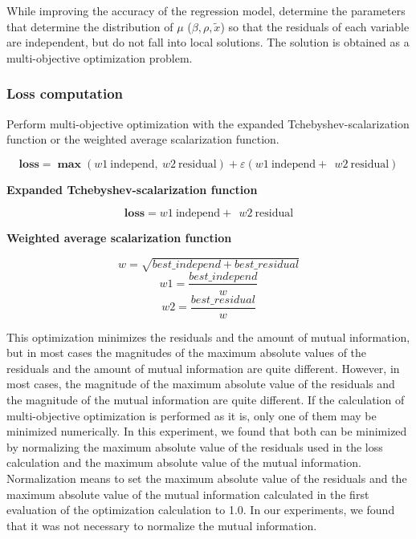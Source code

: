 \documentclass[pdftex]{article}
\begin{document}
While improving the accuracy of the regression model, determine the parameters that determine the distribution of $\mu$ ($\beta,\rho,\widetilde{x}$) so that the residuals of each variable are independent, but do not fall into local solutions. The solution is obtained as a multi-objective optimization problem. 


\subsubsection{Loss computation}
Perform multi-objective optimization with the expanded Tchebyshev-scalarization function or the weighted average scalarization function.


\begin{equation}
\mathbf{\text{loss}}\mathbf{=}\mathbf{\max}\left(w1\ \text{independ}, \ w2\ \text{residual} \right) + \varepsilon\left( w1\ \text{independ} + \ \ w2\ \text{residual} \right)
\end{equation}
\centerline{\textbf{Expanded Tchebyshev-scalarization function}}

\begin{equation}
\mathbf{\text{loss}}\mathbf{=}w1\ \text{independ} + \ \ w2\ \text{residual}
\end{equation}
\centerline{\textbf{Weighted average scalarization function}}

$$w = \sqrt{best\_independ + best\_residual}$$
$$w1 = \frac{best\_independ}{w}$$ 
$$w2 =\frac{best\_residual}{w}$$

This optimization minimizes the residuals and the amount of mutual information, but in most cases the magnitudes of the maximum absolute values of the residuals and the amount of mutual information are quite different. However, in most cases, the magnitude of the maximum absolute value of the residuals and the magnitude of the mutual information are quite different. If the calculation of multi-objective optimization is performed as it is, only one of them may be minimized numerically. In this experiment, we found that both can be minimized by normalizing the maximum absolute value of the residuals used in the loss calculation and the maximum absolute value of the mutual information.
Normalization means to set the maximum absolute value of the residuals and the maximum absolute value of the mutual information calculated in the first evaluation of the optimization calculation to 1.0.
In our experiments, we found that it was not necessary to normalize the mutual information.
\end{document}
